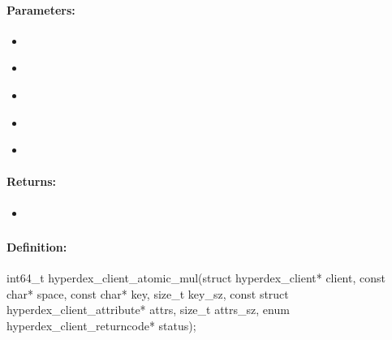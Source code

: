 \paragraph{Parameters:}
\begin{itemize}[noitemsep]
\item {}\\

\item {}\\

\item {}\\

\item {}\\

\item {}\\

\end{itemize}

\paragraph{Returns:}
\begin{itemize}[noitemsep]
\item {}\\

\end{itemize}

\pagebreak
\subsubsection{}
\label{api:c:atomic_mul}


\paragraph{Definition:}
\begin{ccode}
int64_t hyperdex_client_atomic_mul(struct hyperdex_client* client,
        const char* space,
        const char* key, size_t key_sz,
        const struct hyperdex_client_attribute* attrs, size_t attrs_sz,
        enum hyperdex_client_returncode* status);
\end{ccode}

